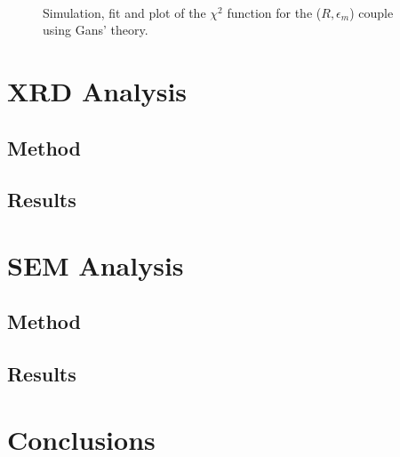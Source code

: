 \documentclass[twocolumn]{article}
\begin{document}
\begin{figure}[H]
\centering
{} 
 \\
\caption{Simulation, fit and plot of the $\chi^2$ function for the ($R,\epsilon_m$) couple using Gans' theory.}
\label{fig:r_epsm_GANS}
\end{figure}
\newpage

\begin{multicols}{2}

\section{XRD Analysis}

\label{sec:XRD}

\subsection{Method}

\subsection{Results}

\section{SEM Analysis}
\label{sec:SEM}

\subsection{Method}

\subsection{Results}

\section{Conclusions}
\label{sec:conclusions}

\clearpage

\printbibliography
\end{multicols}
\end{document}
